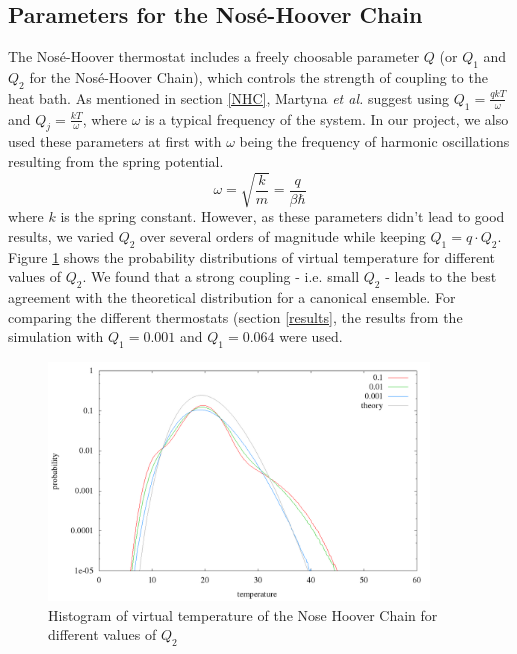 \subsection{Parameters for the Nosé-Hoover Chain}
The Nosé-Hoover thermostat includes a freely choosable parameter $Q$ (or $Q_1$ and $Q_2$ for the Nosé-Hoover Chain), which controls the strength of coupling to the heat bath. As mentioned in section \ref{NHC}, Martyna \textit{et al.} \cite{Martyna1992} suggest using $Q_1 = \frac{qkT}{\omega}$ and $Q_j = \frac{kT}{\omega}$, where $\omega$ is a typical frequency of the system. In our project, we also used these parameters at first with $\omega$ being the frequency of harmonic oscillations resulting from the spring potential.
\begin{equation}
\omega = \sqrt{\frac{k}{m}} = \frac{q}{\beta \hbar}
\end{equation} 
where $k$ is the spring constant. However, as these parameters didn't lead to good results, we varied $Q_2$ over several orders of magnitude while keeping $Q_1 = q\cdot Q_2$. Figure \ref{im:temp_chain} shows the probability distributions of virtual temperature for different values of $Q_2$. We found that a strong coupling - i.e. small $Q_2$ - leads to the best agreement with the theoretical distribution for a canonical ensemble. For comparing the different thermostats (section \ref{results}, the results from the simulation with $Q_1 = 0.001$ and $Q_1 = 0.064$ were used. 

\begin{figure}[H]
\centering
\includegraphics[width=0.9\textwidth]{./graphics/Histogramm_tempCol_one_Chain.png}
\caption{Histogram of virtual temperature of the Nose Hoover Chain for different values of $Q_2$ }
\label{im:temp_chain}
\end{figure}



